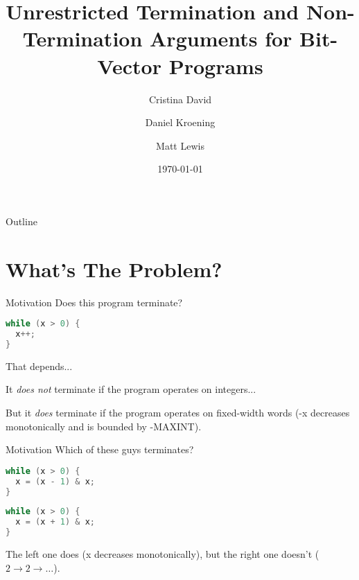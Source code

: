 \documentclass[xcolor=pdftex,t,11pt]{beamer}
\author{Cristina David \and Daniel Kroening \and Matt Lewis}
\title{Unrestricted Termination and Non-Termination Arguments for Bit-Vector Programs}
\institute{University of Oxford}
\date{\today}
\begin{document}

\begin{frame}[plain]
  \titlepage
\end{frame}

\begin{frame}{Outline}
  \tableofcontents
\end{frame}

\section{What's The Problem?}
\begin{frame}[fragile]{Motivation}
Does this program terminate?
\begin{center}
\begin{minipage}{0.4\linewidth}
 \begin{lstlisting}[language=C,basicstyle=\normalsize]
while (x > 0) {
  x++;
}
 \end{lstlisting}
\end{minipage}
\end{center}

\pause

That depends...

It \emph{does not} terminate if the program operates on integers...

But it \emph{does} terminate if the program operates on fixed-width words
(-x decreases monotonically and is bounded by -MAXINT).

\end{frame}

\begin{frame}[fragile]{Motivation}
Which of these guys terminates?
\begin{center}
\begin{minipage}{0.45\linewidth}
 \begin{lstlisting}[language=C,basicstyle=\normalsize]
while (x > 0) {
  x = (x - 1) & x;
}
\end{lstlisting}
\end{minipage}
\begin{minipage}{0.45\linewidth}
 \begin{lstlisting}[language=C,basicstyle=\normalsize]
while (x > 0) {
  x = (x + 1) & x;
}
\end{lstlisting}
\end{minipage}
\end{center}

\pause

The left one does (x decreases monotonically), but the right one doesn't ($2 \rightarrow 2 \rightarrow \dots$).
\end{frame}
\end{document}
